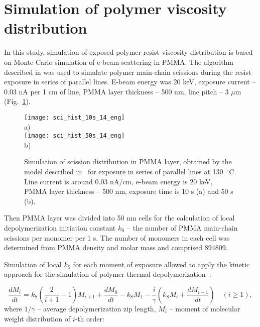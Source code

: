 \section{Simulation of polymer viscosity distribution}
In this study, simulation of exposed polymer resist viscosity distribution is based on Monte-Carlo simulation of e-beam scattering in PMMA. The algorithm described in \cite{my_MEE} was used to simulate polymer main-chain scissions during the resist exposure in series of parallel lines. E-beam energy  was 20 keV, exposure current -- 0.03 nA per 1 cm of line, PMMA layer thickness -- 500 nm, line pitch -- 3 $\mu$m (Fig.~\ref{fig:sci_hist}).

\begin{figure}
	\begin{center}
		\texttt{[image: sci\_hist\_10s\_14\_eng]} \\
		\vspace{-3.7em} \hspace{-26em} a) \vspace{2.7em} \\
		\texttt{[image: sci\_hist\_50s\_14\_eng]} \\
		\vspace{-3.7em} \hspace{-26em} b) \vspace{3.7em} \\
	\end{center}
	\vspace{-2.5em}
	\caption{Simulation of scission distribution in PMMA layer, obtained by the model described in~\cite{my_MEE} for exposure in series of parallel lines at 130~$^\circ$C. Line current is around 0.03 nA/cm, e-beam energy is 20 keV, PMMA layer thickness -- 500 nm, exposure time is 10 s (a) and  50 s (b).}
	\label{fig:sci_hist}
\end{figure}

Then PMMA layer was divided into 50 nm cells for the calculation of local depolymerization initiation constant $k_\mathrm{S}$ -- the number of PMMA main-chain scissions per monomer per 1 s. The number of monomers in each cell was determined from PMMA density and molar mass and comprised 894809.

Simulation of local $k_\mathrm{S}$ for each moment of exposure allowed to apply the kinetic approach for the simulation of polymer thermal depolymerization~\cite{Boyd_1}:

\begin{equation} \label{eq:moment_equation}
	\frac{d M_i}{d t}=k_\mathrm{S}(\frac{2}{i+1}-1) M_{i+1}+\frac{d M_0}{d t}-k_\mathrm{S} M_1 - \frac{i}{\gamma}(k_\mathrm{S} M_i+\frac{d M_{i-1}}{d t}) \quad(i \geq 1),
\end{equation}
where $1/\gamma$ -- average depolymerization zip length, $M_i$ -- moment of molecular weight distribution of $i$-th order:

